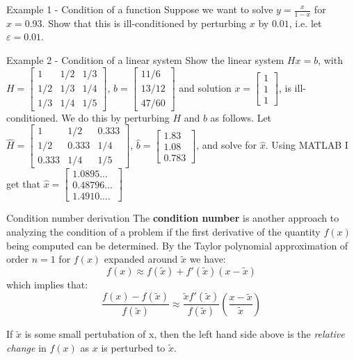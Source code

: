 \documentclass[12pt]{beamer}
\begin{document}
\begin{frame}{Example 1 - Condition of a function}
Suppose we want to solve $y=\frac{x}{1-x}$ for $x=0.93$. Show that this is ill-conditioned by perturbing $x$ by $0.01$, i.e. let $\varepsilon=0.01$.
\vspace{3 in}
\end{frame} 


\begin{frame}{Example 2 - Condition of a linear system}
Show the linear system $Hx=b$, with $H=\begin{bmatrix} 1 &	1/2 & 1/3 \\ 1/2	 & 1/3 & 1/4 \\ 1/3 & 1/4 & 1/5 \end{bmatrix}$, $b=\begin{bmatrix} 11/6 \\ 13/12 \\ 47/60 \end{bmatrix}$ and solution $x=\begin{bmatrix} 1 \\ 1 \\ 1 \end{bmatrix}$, is ill-conditioned. We do this by perturbing $H$ and $b$ as follows. Let $\hat{H}=\begin{bmatrix} 1 &	1/2 & 0.333 \\ 1/2	 & 0.333 & 1/4 \\ 0.333 & 1/4 & 1/5 \end{bmatrix}$, $\hat{b}=\begin{bmatrix} 1.83 \\ 1.08 \\ 0.783 \end{bmatrix}$, and solve for $\hat{x}$. Using MATLAB I get that  $\hat{x}=\begin{bmatrix} 1.0895... \\ 0.48796... \\ 1.4910.... \end{bmatrix}$

\vspace{3 in}
\end{frame} 


\begin{frame}{Condition number derivation} 
The {\bf condition number} is another approach to analyzing the
condition of a problem if the first derivative of the quantity $f(x)$ being computed can be determined. By the Taylor polynomial approximation of order $n=1$ for $f(x)$ expanded around $\tilde x$ we have: 
\[
f(x) \approx f(\tilde x) + f'(\tilde x)(x - \tilde x)
\]
\noindent 
which implies that:  
\[ 
  \frac{f(x) - f(\tilde x)}{f(\tilde x)} \approx \frac{\tilde x f'( \tilde x)}{f(\tilde x)} \left( \frac{x-\tilde x}{\tilde x} \right) 
\] 

\noindent 
If $\tilde x$ is some small pertubation of x, then the left hand side above is the {\it relative change} in $f(x)$ as $x$ is perturbed to $\tilde x$. 
\end{frame} 
\end{document}
